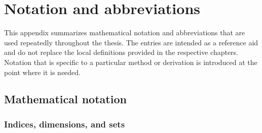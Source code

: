 \chapter{Notation and abbreviations}
\label{app:notation}

This appendix summarizes mathematical notation and abbreviations that are used repeatedly throughout the thesis. The entries are intended as a reference aid and do not replace the local definitions provided in the respective chapters. Notation that is specific to a particular method or derivation is introduced at the point where it is needed.

\section{Mathematical notation}

\subsection*{Indices, dimensions, and sets}

